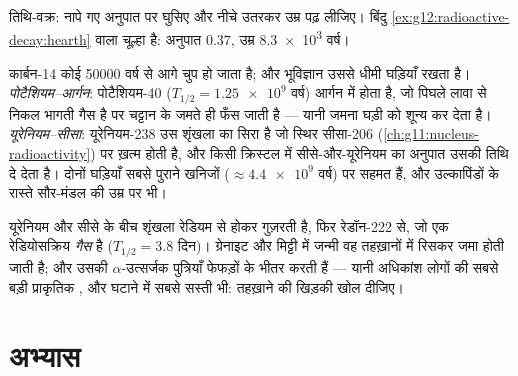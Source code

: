 \begin{omfigure}

{\small तिथि-वक्र: नापे गए अनुपात पर घुसिए और नीचे उतरकर उम्र पढ़ लीजिए। बिंदु
\cref{ex:g12:radioactive-decay:hearth} वाला चूल्हा है: अनुपात $0.37$, उम्र \num{8.3e3} वर्ष।}
\end{omfigure}

\begin{example}[चट्टानों की घड़ियाँ]\label{ex:g12:radioactive-decay:rocks}
कार्बन-14 कोई \num{50000} वर्ष से आगे चुप हो जाता है; और भूविज्ञान उससे धीमी
घड़ियाँ रखता है। \emph{पोटैशियम--आर्गन}: पोटैशियम-40 ($T_{1/2} = \num{1.25e9}$ वर्ष) आर्गन में
 होता है, जो पिघले लावा से निकल भागती गैस है पर चट्टान के जमते ही
फँस जाती है --- यानी जमना घड़ी को शून्य कर देता है। \emph{यूरेनियम--सीसा}:
यूरेनियम-238 उस शृंखला का सिरा है जो स्थिर सीसा-206 (\cref{ch:g11:nucleus-radioactivity}) पर
ख़त्म होती है, और किसी क्रिस्टल में सीसे-और-यूरेनियम का अनुपात उसकी तिथि दे
देता है। दोनों घड़ियाँ सबसे पुराने खनिजों ($\approx \num{4.4e9}$ वर्ष) पर सहमत हैं, और
उल्कापिंडों के रास्ते सौर-मंडल की उम्र पर भी।
\end{example}

\begin{remark}[शृंखलाएँ, और तहख़ाने की गैस]\label{rem:g12:radioactive-decay:radon}
यूरेनियम और सीसे के बीच शृंखला रेडियम से होकर गुज़रती है, फिर रेडॉन-222 से, जो
एक रेडियोसक्रिय \emph{गैस} है ($T_{1/2} = 3.8$ दिन)। ग्रेनाइट और मिट्टी में जन्मी वह
तहख़ानों में रिसकर जमा होती जाती है; और उसकी $\alpha$-उत्सर्जक पुत्रियाँ
फेफड़ों के भीतर  करती हैं --- यानी अधिकांश लोगों की सबसे बड़ी प्राकृतिक
, और घटाने में सबसे सस्ती भी: तहख़ाने की खिड़की खोल दीजिए।
\end{remark}

\section{अभ्यास}

